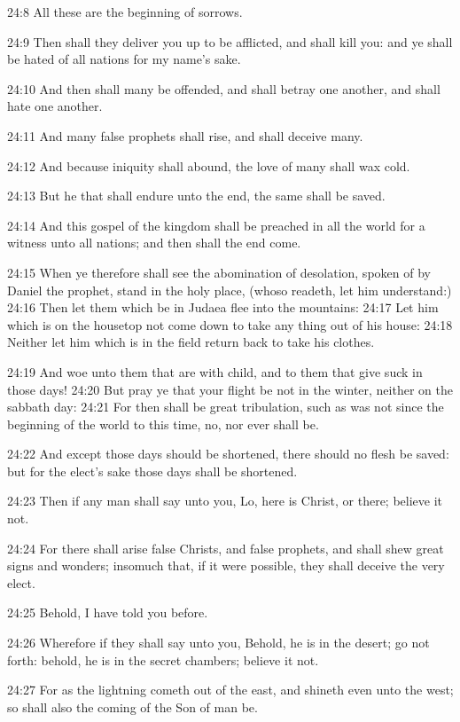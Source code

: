 24:8 All these are the beginning of sorrows.

24:9 Then shall they deliver you up to be afflicted, and shall kill you: and ye shall be hated of all nations for my name's sake.

24:10 And then shall many be offended, and shall betray one another, and shall hate one another.

24:11 And many false prophets shall rise, and shall deceive many.

24:12 And because iniquity shall abound, the love of many shall wax cold.

24:13 But he that shall endure unto the end, the same shall be saved.

24:14 And this gospel of the kingdom shall be preached in all the world for a witness unto all nations; and then shall the end come.

24:15 When ye therefore shall see the abomination of desolation, spoken of by Daniel the prophet, stand in the holy place, (whoso readeth, let him understand:) 24:16 Then let them which be in Judaea flee into the mountains: 24:17 Let him which is on the housetop not come down to take any thing out of his house: 24:18 Neither let him which is in the field return back to take his clothes.

24:19 And woe unto them that are with child, and to them that give suck in those days!  24:20 But pray ye that your flight be not in the winter, neither on the sabbath day: 24:21 For then shall be great tribulation, such as was not since the beginning of the world to this time, no, nor ever shall be.

24:22 And except those days should be shortened, there should no flesh be saved: but for the elect's sake those days shall be shortened.

24:23 Then if any man shall say unto you, Lo, here is Christ, or there; believe it not.

24:24 For there shall arise false Christs, and false prophets, and shall shew great signs and wonders; insomuch that, if it were possible, they shall deceive the very elect.

24:25 Behold, I have told you before.

24:26 Wherefore if they shall say unto you, Behold, he is in the desert; go not forth: behold, he is in the secret chambers; believe it not.

24:27 For as the lightning cometh out of the east, and shineth even unto the west; so shall also the coming of the Son of man be.

